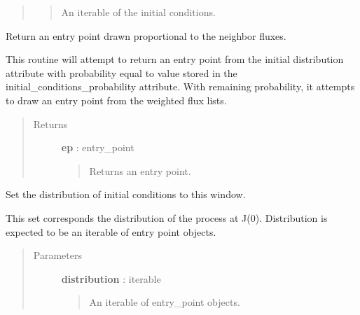\documentclass[letterpaper,10pt,english]{sphinxmanual}
\begin{document}
\begin{fulllineitems}
\begin{fulllineitems}
\begin{quote}
\begin{description}
\begin{quote}
An iterable of the initial conditions.
\end{quote}

\end{description}\end{quote}

\end{fulllineitems}


\begin{fulllineitems}
\label{neus/neus.doc:neus.window.Window.reinject}
Return an entry point drawn proportional to the neighbor fluxes.

This routine will attempt to return an entry point from the initial distribution attribute with probability equal to value stored in the initial\_conditions\_probability attribute. With remaining probability, it attempts to draw an entry point from the weighted flux lists.
\begin{quote}\begin{description}
\item[{Returns}] \leavevmode
\textbf{ep} : entry\_point
\begin{quote}

Returns an entry point.
\end{quote}

\end{description}\end{quote}

\end{fulllineitems}


\begin{fulllineitems}
\label{neus/neus.doc:neus.window.Window.set_initial_conditions}
Set the distribution of initial conditions to this window.

This set corresponds the distribution of the process at J(0). Distribution is expected to be an iterable of entry point objects.
\begin{quote}\begin{description}
\item[{Parameters}] \leavevmode
\textbf{distribution} : iterable
\begin{quote}

An iterable of entry\_point objects.
\end{quote}


\end{description}
\end{quote}
\end{fulllineitems}
\end{fulllineitems}
\end{document}
